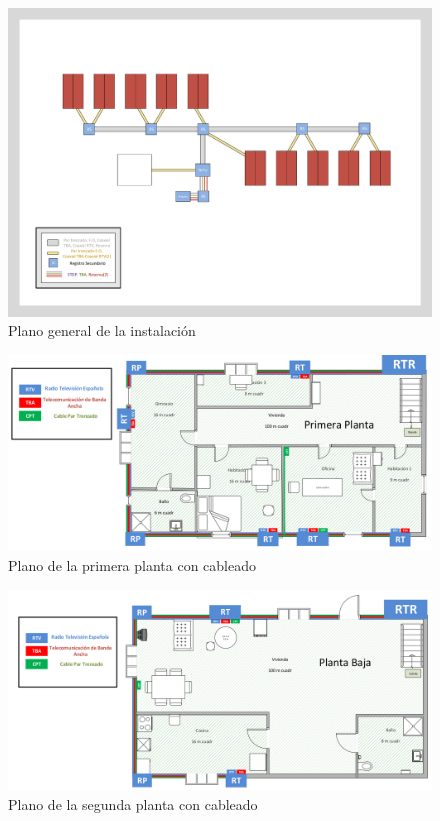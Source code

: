 \begin{landscape}
	\begin{figure}[H]
		\centering
		\includegraphics[scale=0.50]{../img/PLANOFINAL.pdf}
		\caption{Plano general de la instalación}
		\label{pla_general}
	\end{figure}
\end{landscape}

\begin{landscape}
	\begin{figure}[H]
		\centering
		\includegraphics[scale=0.68]{../img/PlanoCableadoVivienda1.png}
		\caption{Plano de la primera planta con cableado}
	\end{figure}
\end{landscape}

\begin{landscape}
	\begin{figure}[H]
		\centering
		\includegraphics[scale=0.68]{../img/PlanoCableadoVivienda2.png}
		\caption{Plano de la segunda planta con cableado}
	\end{figure}
\end{landscape}
